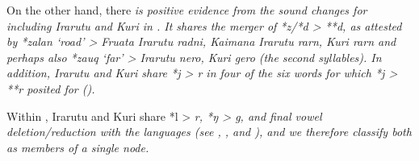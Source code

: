 On the other hand,
there \it{is} positive evidence from the sound changes for including
Irarutu and Kuri in .
It shares the merger of *z/*d > **d,
as attested by *zalan ‘road’ > Fruata Irarutu \it{radni},
Kaimana Irarutu \it{rarn}, Kuri \it{rarn}
and perhaps also *zauq ‘far’ > Irarutu \it{nero},
Kuri \it{gero} (the second syllables).
In addition, Irarutu and Kuri share *j > \it{r} in four of the
six words for which *j > **r posited for  ().

Within , Irarutu and Kuri share *l > \it{r},
*ŋ > \it{g}, and final vowel deletion/reduction with the  languages (see ,
, and ), and we therefore classify both
as members of a single  node.